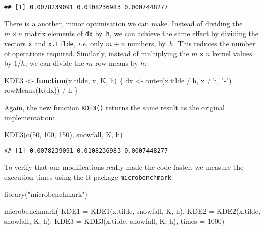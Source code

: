 \documentclass[
  a4paper,
]{article}
\newenvironment{Shaded}{\begin{snugshade}}{\end{snugshade}}
\newcommand{\AttributeTok}[1]{\textcolor[rgb]{0.77,0.63,0.00}{#1}}
\newcommand{\ControlFlowTok}[1]{\textcolor[rgb]{0.13,0.29,0.53}{\textbf{#1}}}
\newcommand{\DecValTok}[1]{\textcolor[rgb]{0.00,0.00,0.81}{#1}}
\newcommand{\FunctionTok}[1]{\textcolor[rgb]{0.00,0.00,0.00}{#1}}
\newcommand{\NormalTok}[1]{#1}
\newcommand{\OtherTok}[1]{\textcolor[rgb]{0.56,0.35,0.01}{#1}}
\newcommand{\SpecialCharTok}[1]{\textcolor[rgb]{0.00,0.00,0.00}{#1}}
\newcommand{\StringTok}[1]{\textcolor[rgb]{0.31,0.60,0.02}{#1}}
\theoremstyle{definition}
\theoremstyle{definition}
\theoremstyle{definition}
\theoremstyle{definition}
\theoremstyle{remark}
\begin{document}
\begin{verbatim}
## [1] 0.0078239091 0.0108236983 0.0007448277
\end{verbatim}

There is a another, minor optimisation we can make. Instead of dividing the
\(m\times n\) matrix elements of \texttt{dx} by~\texttt{h}, we can achieve the same effect by
dividing the vectors \texttt{x} and \texttt{x.tilde}, \emph{i.e.} only \(m+n\) numbers, by~\(h\).
This reduces the number of operations required. Similarly, instead of
multiplying the \(m\times n\) kernel values by \(1/h\), we can divide the \(m\) row
means by \(h\):

\begin{Shaded}
\begin{Highlighting}[]
\NormalTok{KDE3 }\OtherTok{\textless{}{-}} \ControlFlowTok{function}\NormalTok{(x.tilde, x, K, h) \{}
\NormalTok{  dx }\OtherTok{\textless{}{-}} \FunctionTok{outer}\NormalTok{(x.tilde }\SpecialCharTok{/}\NormalTok{ h, x }\SpecialCharTok{/}\NormalTok{ h, }\StringTok{"{-}"}\NormalTok{)}
  \FunctionTok{rowMeans}\NormalTok{(}\FunctionTok{K}\NormalTok{(dx)) }\SpecialCharTok{/}\NormalTok{ h}
\NormalTok{\}}
\end{Highlighting}
\end{Shaded}

Again, the new function \texttt{KDE3()} returns the same result as the original
implementation:

\begin{Shaded}
\begin{Highlighting}[]
\FunctionTok{KDE3}\NormalTok{(}\FunctionTok{c}\NormalTok{(}\DecValTok{50}\NormalTok{, }\DecValTok{100}\NormalTok{, }\DecValTok{150}\NormalTok{), snowfall, K, h)}
\end{Highlighting}
\end{Shaded}

\begin{verbatim}
## [1] 0.0078239091 0.0108236983 0.0007448277
\end{verbatim}

To verify that our modifications really made the code faster, we measure
the execution times using the R package \texttt{microbenchmark}:

\begin{Shaded}
\begin{Highlighting}[]
\FunctionTok{library}\NormalTok{(}\StringTok{"microbenchmark"}\NormalTok{)}

\FunctionTok{microbenchmark}\NormalTok{(}
  \AttributeTok{KDE1 =} \FunctionTok{KDE1}\NormalTok{(x.tilde, snowfall, K, h),}
  \AttributeTok{KDE2 =} \FunctionTok{KDE2}\NormalTok{(x.tilde, snowfall, K, h),}
  \AttributeTok{KDE3 =} \FunctionTok{KDE3}\NormalTok{(x.tilde, snowfall, K, h),}
  \AttributeTok{times =} \DecValTok{1000}\NormalTok{)}
\end{Highlighting}
\end{Shaded}
\end{document}
